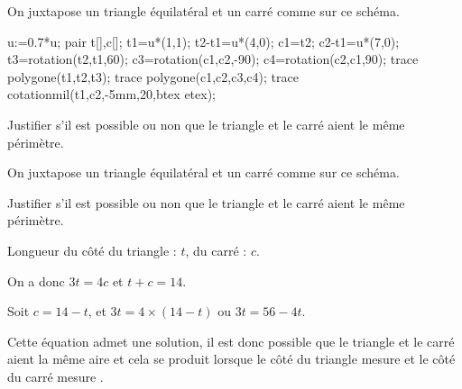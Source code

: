 \begin{exercice*}
    On juxtapose un triangle équilatéral et un carré comme sur ce schéma.
    
    \begin{Geometrie}
        u:=0.7*u;
        pair t[],c[];
        t1=u*(1,1);
        t2-t1=u*(4,0);
        c1=t2;
        c2-t1=u*(7,0);
        t3=rotation(t2,t1,60);
        c3=rotation(c1,c2,-90);
        c4=rotation(c2,c1,90);
        trace polygone(t1,t2,t3);
        trace polygone(c1,c2,c3,c4);
        trace cotationmil(t1,c2,-5mm,20,btex  etex);
    \end{Geometrie}

    Justifier s'il est possible ou non que le triangle et le carré aient le même périmètre.
\end{exercice*}
\begin{corrige}
        On juxtapose un triangle équilatéral et un carré comme sur ce schéma.

    
    Justifier s'il est possible ou non que le triangle et le carré aient le même périmètre.

    {\color{red} Longueur du côté du triangle : $t$, du carré : $c$.

    On a donc $3t=4c$ et $t+c=14$.

    Soit $c=14-t$, et $3t=4\times(14-t)$ ou $3t=56-4t$.
    }
    \Coupe
    {\color{red}
    Cette équation admet une solution, il est donc possible que le triangle et le carré aient la même aire et cela
    se produit lorsque le côté du triangle mesure  et le côté du carré mesure .
    }
\end{corrige}

